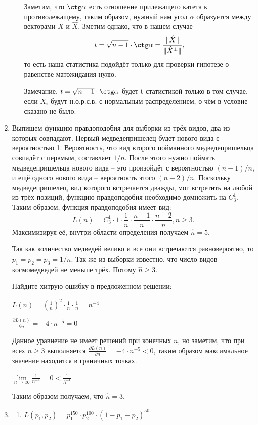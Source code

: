 \begin{enumerate}
\begin{enumerate}
Заметим, что $\ctg \alpha$ есть отношение прилежащего катета к противолежащему, таким образом, нужный нам угол $\alpha$ образуется между векторами $X$ и $\hat{X}$. Зметим однако, что в нашем случае
\[
t=\sqrt{n-1}\cdot \ctg \alpha=\frac{\lVert\hat{X}\rVert}{\lVert\hat{X}^{\perp}\rVert},
\]
то есть наша статистика подойдёт только для проверки гипотезе о равенстве матожидания нулю.

Замечание. $t=\sqrt{n-1}\cdot \ctg \alpha$ будет t-статистикой только в том случае, если $X_i$ будут н.о.р.с.в. с нормальным распределением, о чём в условие сказано не было.
\end{enumerate}
\item Выпишем функцию правдоподобия для выборки из трёх видов, два из которых совпадают. Первый медведепришелец будет нового вида с вероятностью 1. Вероятность, что вид второго пойманного медведепришельца совпадёт с первмым, составляет $1/n$. После этого нужно поймать медведепришельца нового вида – это произойдёт с вероятностью $(n-1)/n$, и ещё одного нового вида – вероятность этого $(n-2)/n$. Поскольку медведепришелец, вид которого встречается дважды, мог встретить на любой из трёх позиций, функцию правдоподобия необходимо домножить на $C_3^1$. Таким образом, функция правдоподобия имеет вид:
\[
L(n) = C_3^1 \cdot 1 \cdot \frac{1}{n} \cdot \frac{n-1}{n} \cdot \frac{n-2}{n}, n \geq 3.
\]
Максимизируя её, внутри области определения получаем $\hat n = 5$.

Так как количество медведей велико и все они встречаются равновероятно, то $p_{1}=p_{2}=p_{3}=1/n$. Так же из выборки известно, что число видов космомедведей не меньше трёх. Потому $\hat{n} \ge 3$.

Найдите хитрую ошибку в предложенном решении:

$L(n)=\left(\frac{1}{n}\right)^{2} \cdot \frac{1}{n}\cdot\frac{1}{n}=n^{-4}$

$\frac{\partial L(n)}{\partial n} = -4\cdot n^{-5}=0$

Данное уравнение не имеет решений при конечных $n$, но заметим, что при всех $n \ge 3$ выполняется $\frac{\partial L(n)}{\partial n} = -4\cdot n^{-5} < 0$, таким образом максимальное значение находится в граничных точках.

$\lim\limits_{n\to\infty}\frac{1}{n^{-4}}=0 < \frac{1}{3^{-4}}$

Таким образом получаем, что $\hat{n}=3$.

\item \begin{enumerate}
\item $L(p_{1},p_{2})=p_{1}^{150}\cdot p_{2}^{100}\cdot(1-p_{1}-p_{2})^{50}$


\end{enumerate}
\end{enumerate}

